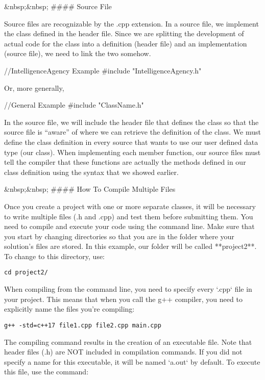 {\begin{example}
{{    private:
        string classified_intelligence;
};
    {%
\end{example}

&nbsp;&nbsp;
#### Source File

Source files are recognizable by the .cpp extension. In a source file, we implement the class defined in the header file. Since we are splitting the development of actual code for the class into a definition (header file) and an implementation (source file), we need to link the two somehow.

{%
//IntelligenceAgency Example
#include "IntelligenceAgency.h"
{%

Or, more generally,

{%
//General Example
#include "ClassName.h"
{%

In the source file, we will include the header file that defines the class so that the source file is “aware” of where we can retrieve the definition of the class. We must define the class definition in every source that wants to use our user defined data type (our class). When implementing each member function, our source files must tell the compiler that these functions are actually the methods defined in our class definition using the syntax that we showed earlier.

&nbsp;&nbsp;
#### How To Compile Multiple Files

Once you create a project with one or more separate classes, it will be necessary to write multiple files (.h and .cpp) and test them before submitting them. You need to compile and execute your code using the command line. Make sure that you start by changing directories so that you are in the folder where your solution’s files are stored. In this example, our folder will be called **project2**. To change to this directory, use:

\texttt{cd project2/}

When compiling from the command line, you need to specify every `.cpp` file in your project. This means that when you call the g++ compiler, you need to explicitly name the files you’re compiling:

\texttt{g++ -std=c++17 file1.cpp file2.cpp main.cpp}

The compiling command results in the creation of an executable file. Note that header files (.h) are NOT included in compilation commands. If you did not specify a name for this executable, it will be named `a.out` by default. To execute this file, use the command:

}}}}}
